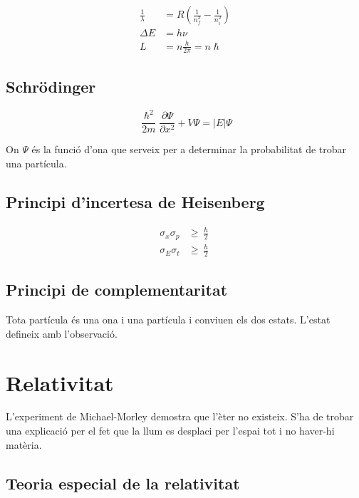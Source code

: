 \begin{align}
    \frac{1}{\lambda}&=R \left( \frac{1}{n_f^2} - \frac{1}{n_i^2} \right) \\
    \Delta E &= h\nu \\
    L &= n \frac{h}{2\pi} = n\hslash
\end{align}

\subsection{Schrödinger}
\label{sub:schrodinger}

\begin{equation}
    \frac{\hslash^2}{2m} \frac{\partial \Psi}{\partial x^2} + V\Psi = |E| \Psi
\end{equation}

On $\Psi$ és la funció d'ona que serveix per a determinar la probabilitat
de trobar una partícula.

\subsection{Principi d'incertesa de Heisenberg}
\label{sub:principi_d_incertesa_de_heisenberg}

\begin{align}
    \sigma_x \sigma_p &\geq \frac{\hslash}{2} \\
    \sigma_E \sigma_t &\geq \frac{\hslash}{2}
\end{align}

\subsection{Principi de complementaritat}
\label{sub:principi_de_complementaritat}

Tota partícula és una ona i una partícula i conviuen els dos estats. L'estat
defineix amb l'observació.

\section{Relativitat}
\label{sec:relativitat}

L'experiment de Michael-Morley demostra que l'èter no existeix. S'ha de trobar
una explicació per el fet que la llum es desplaci per l'espai tot i no haver-hi
matèria.

\subsection{Teoria especial de la relativitat}
\label{sub:teoria_especial_de_la_relativitat}

